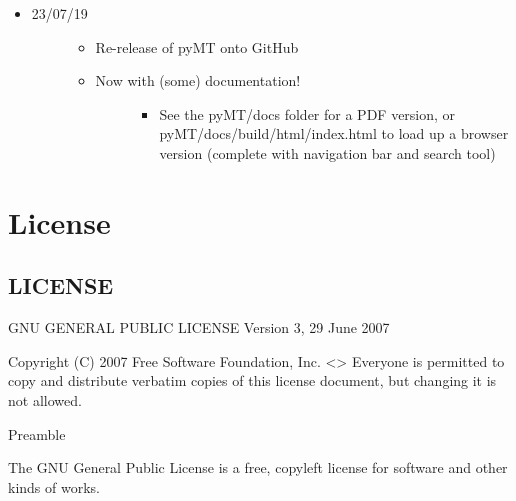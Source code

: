 \documentclass[letterpaper,10pt,english]{sphinxmanual}
\begin{document}
\begin{itemize}
\begin{description}
\begin{itemize}
\end{itemize}

\end{description}

\item {} \begin{description}
\item[{23/07/19}] \leavevmode\begin{itemize}
\item {} 
Re-release of pyMT onto GitHub

\item {} \begin{description}
\item[{Now with (some) documentation!}] \leavevmode\begin{itemize}
\item {} 
See the pyMT/docs folder for a PDF version, or pyMT/docs/build/html/index.html to load up a browser version (complete with navigation bar and search tool)

\end{itemize}

\end{description}

\end{itemize}

\end{description}

\end{itemize}


\section{License}
\label{\detokenize{index:license}}

\subsection{LICENSE}
\label{\detokenize{content/misc/LICENSE:license}}\label{\detokenize{content/misc/LICENSE::doc}}
GNU GENERAL PUBLIC LICENSE
Version 3, 29 June 2007

Copyright (C) 2007 Free Software Foundation, Inc. \textless{}\textgreater{}
Everyone is permitted to copy and distribute verbatim copies
of this license document, but changing it is not allowed.

Preamble

The GNU General Public License is a free, copyleft license for
software and other kinds of works.
\end{document}
